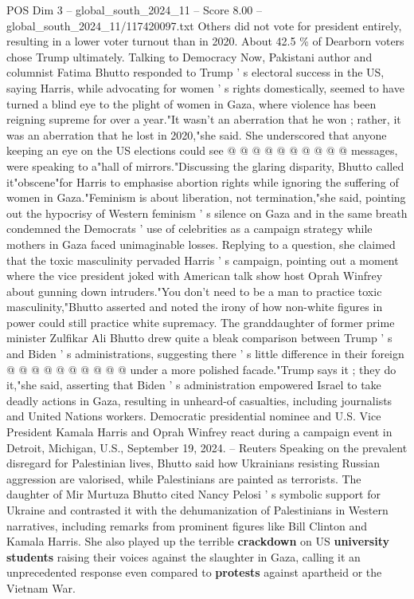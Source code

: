 \begin{textsample}{POS Dim 3 – global\_south\_2024\_11 – Score 8.00 – global\_south\_2024\_11/117420097.txt}
Others did not vote for president entirely, resulting in a lower voter turnout than in 2020.
About 42.5 \% of Dearborn voters chose Trump ultimately.
Talking to Democracy Now, Pakistani author and columnist Fatima Bhutto responded to Trump ' s electoral success in the US, saying Harris, while advocating for women ' s rights domestically, seemed to have turned a blind eye to the plight of women in Gaza, where violence has been reigning supreme for over a year."It wasn't an aberration that he won ; rather, it was an aberration that he lost in 2020,"she said.
She underscored that anyone keeping an eye on the US elections could see @ @ @ @ @ @ @ @ @ @ messages, were speaking to a"hall of mirrors."Discussing the glaring disparity, Bhutto called it"obscene"for Harris to emphasise abortion rights while ignoring the suffering of women in Gaza."Feminism is about liberation, not termination,"she said, pointing out the hypocrisy of Western feminism ' s silence on Gaza and in the same breath condemned the Democrats ' use of celebrities as a campaign strategy while mothers in Gaza faced unimaginable losses.
Replying to a question, she claimed that the toxic masculinity pervaded Harris ' s campaign, pointing out a moment where the vice president joked with American talk show host Oprah Winfrey about gunning down intruders."You don't need to be a man to practice toxic masculinity,"Bhutto asserted and noted the irony of how non-white figures in power could still practice white supremacy.
The granddaughter of former prime minister Zulfikar Ali Bhutto drew quite a bleak comparison between Trump ' s and Biden ' s administrations, suggesting there ' s little difference in their foreign @ @ @ @ @ @ @ @ @ @ under a more polished facade."Trump says it ; they do it,"she said, asserting that Biden ' s administration empowered Israel to take deadly actions in Gaza, resulting in unheard-of casualties, including journalists and United Nations workers.
Democratic presidential nominee and U.S.
Vice President Kamala Harris and Oprah Winfrey react during a campaign event in Detroit, Michigan, U.S., September 19, 2024. -- Reuters Speaking on the prevalent disregard for Palestinian lives, Bhutto said how Ukrainians resisting Russian aggression are valorised, while Palestinians are painted as terrorists.
The daughter of Mir Murtuza Bhutto cited Nancy Pelosi ' s symbolic support for Ukraine and contrasted it with the dehumanization of Palestinians in Western narratives, including remarks from prominent figures like Bill Clinton and Kamala Harris.
She also played up the terrible \textbf{crackdown} on US \textbf{university} \textbf{students} raising their voices against the slaughter in Gaza, calling it an unprecedented response even compared to \textbf{protests} against apartheid or the Vietnam War.

\end{textsample}
